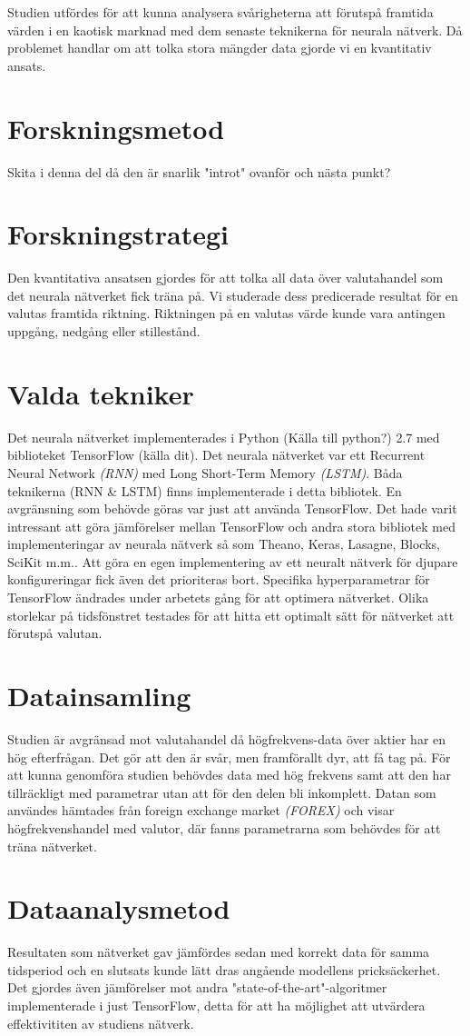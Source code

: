 Studien utfördes för att kunna analysera svårigheterna att förutspå framtida värden i en kaotisk marknad med dem senaste teknikerna för neurala nätverk. Då problemet handlar om att tolka stora mängder data gjorde vi en kvantitativ ansats.


\section{Forskningsmetod}
Skita i denna del då den är snarlik "introt" ovanför och nästa punkt?

\section{Forskningstrategi}
Den kvantitativa ansatsen gjordes för att tolka all data över valutahandel som det neurala nätverket fick träna på. Vi studerade dess predicerade resultat för en valutas framtida riktning. Riktningen på en valutas värde kunde vara antingen uppgång, nedgång eller stillestånd.

\section{Valda tekniker}
Det neurala nätverket implementerades i Python (Källa till python?) 2.7 med biblioteket TensorFlow (källa dit). Det neurala nätverket var ett Recurrent Neural Network \textit{(RNN)} med Long Short-Term Memory \textit{(LSTM)}. Båda teknikerna (RNN \& LSTM) finns implementerade i detta bibliotek. En avgränsning som behövde göras var just att använda TensorFlow. Det hade varit intressant att göra jämförelser mellan TensorFlow och andra stora bibliotek med implementeringar av neurala nätverk så som Theano, Keras, Lasagne, Blocks, SciKit m.m.. Att göra en egen implementering av ett neuralt nätverk för djupare konfigureringar fick även det prioriteras bort. Specifika hyperparametrar för TensorFlow ändrades under arbetets gång för att optimera nätverket. Olika storlekar på tidsfönstret testades för att hitta ett optimalt sätt för nätverket att förutspå valutan.

\section{Datainsamling}
Studien är avgränsad mot valutahandel då högfrekvens-data över aktier har en hög efterfrågan. Det gör att den är svår, men framförallt dyr, att få tag på. För att kunna genomföra studien behövdes data med hög frekvens samt att den har tillräckligt med parametrar utan att för den delen bli inkomplett. Datan som användes hämtades från foreign exchange market \textit{(FOREX)} och visar högfrekvenshandel med valutor, där fanns parametrarna som behövdes för att träna nätverket.

\section{Dataanalysmetod}
Resultaten som nätverket gav jämfördes sedan med korrekt data för samma tidsperiod och en slutsats kunde lätt dras angående modellens pricksäckerhet. Det gjordes även jämförelser mot andra "state-of-the-art"-algoritmer implementerade i just TensorFlow, detta för att ha möjlighet att utvärdera effektivititen av studiens nätverk.
